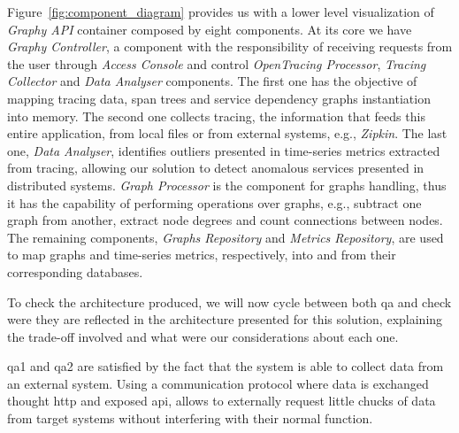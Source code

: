 Figure~\ref{fig:component_diagram} provides us with a lower level visualization of \emph{Graphy API} container composed by eight components. At its core we have \emph{Graphy Controller}, a component with the responsibility of receiving requests from the user through \emph{Access Console} and control \emph{OpenTracing Processor}, \emph{Tracing Collector} and \emph{Data Analyser} components. The first one has the objective of mapping tracing data, span trees and service dependency graphs instantiation into memory. The second one collects tracing, the information that feeds this entire application, from local files or from external systems, e.g., \emph{Zipkin}. The last one, \emph{Data Analyser}, identifies outliers presented in time-series metrics extracted from tracing, allowing our solution to detect anomalous services presented in distributed systems. \emph{Graph Processor} is the component for graphs handling, thus it has the capability of performing operations over graphs, e.g., subtract one graph from another, extract node degrees and count connections between nodes. The remaining components, \emph{Graphs Repository} and \emph{Metrics Repository}, are used to map graphs and time-series metrics, respectively, into and from their corresponding databases.

To check the architecture produced, we will now cycle between both \gls{qa} and check were they are reflected in the architecture presented for this solution, explaining the trade-off involved and what were our considerations about each one.

\gls{qa}1 and \gls{qa}2 are satisfied by the fact that the system is able to collect data from an external system. Using a communication protocol where data is exchanged thought \gls{http} and exposed \gls{api}, allows to externally request little chucks of data from target systems without interfering with their normal function.


